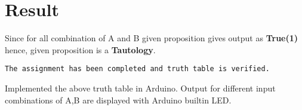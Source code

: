 \documentclass{article}
\begin{document}
\section{Result}
Since for all combination of A and B given proposition gives output as \textbf{True(1)} hence, given proposition is a \textbf{Tautology}. 
\begin{verbatim}
The assignment has been completed and truth table is verified.
\end{verbatim}
Implemented the above truth table in Arduino. Output for different input combinations of A,B are displayed with Arduino builtin LED.\\
\end{document}
